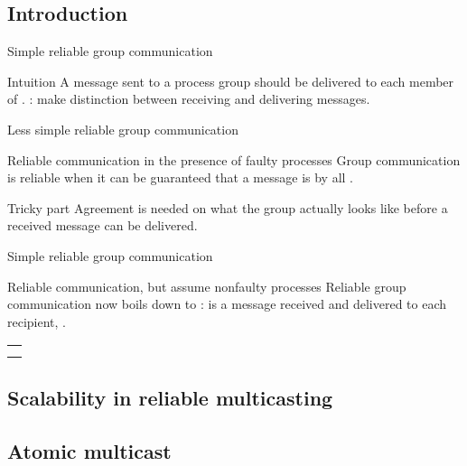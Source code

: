 \subsection{Introduction}
\begin{slide}{Simple reliable group communication}
  \begin{block}{Intuition}
    A message sent to a process group  should be delivered to each member of
    . : make distinction between receiving and delivering messages.
  \end{block}
  \begin{centerfig}
  \end{centerfig}
\end{slide}
\begin{slide}{Less simple reliable group communication}
  \begin{block}{Reliable communication in the presence of faulty processes}
    Group communication is reliable when it can be guaranteed that a message is  by all .
  \end{block}
  \begin{block}{Tricky part}
    Agreement is needed on what the group actually looks like before a received message can be delivered.
  \end{block}
\end{slide}
\begin{slide}{Simple reliable group communication}
  \begin{block}{Reliable communication, but assume nonfaulty processes}
    Reliable group communication now boils down to : is a message received and
    delivered to each recipient, .
  \end{block}
  \begin{centerfig}
    \begin{tabular}{c}
      {08-24a} \\
      {08-24b} \\
    \end{tabular}
  \end{centerfig}
\end{slide}
\subsection{Scalability in reliable multicasting}
\subsection{Atomic multicast}
